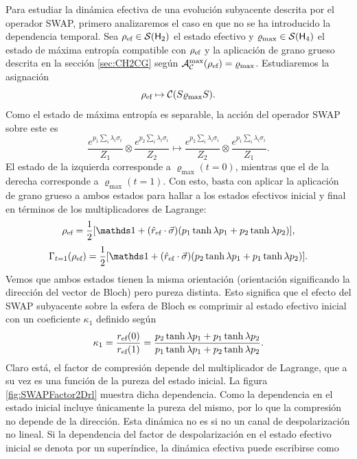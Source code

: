Para estudiar la dinámica efectiva de una evolución subyacente descrita por el operador SWAP, primero analizaremos el caso en que no se ha introducido la dependencia temporal. Sea $\rho_{\text{ef}}\in\mathcal{S}({\sf H}_{2})$ el estado efectivo y $\varrho_{\max}\in\mathcal{S}({\sf H}_{4})$ el estado de máxima entropía compatible con $\rho_{\text{ef}}$ y la aplicación de grano grueso descrita en la sección \ref{sec:CH2CG} según $\mathcal{A}_{\mathcal{C}}^{\max}(\rho_{\text{ef}})=\varrho_{\max}$. Estudiaremos la asignación
\begin{equation}
  \rho_{\text{ef}}\mapsto \mathcal{C}(S \varrho_{\max} S).
\end{equation}
Como el estado de máxima entropía es separable, la acción del operador SWAP sobre este es
\begin{equation}
  \frac{e^{p_{1}\sum_{i}\lambda_{i}\sigma_{i}}}{Z_{1}} \otimes \frac{e^{p_{2}\sum_{i}\lambda_{i}\sigma_{i}}}{Z_{2}}\mapsto\frac{e^{p_{2}\sum_{i}\lambda_{i}\sigma_{i}}}{Z_{2}}\otimes\frac{e^{p_{1}\sum_{i}\lambda_{i}\sigma_{i}}}{Z_{1}}.\nonumber
\end{equation}
El estado de la izquierda corresponde a $\varrho_{\max}(t=0)$, mientras que el de la derecha corresponde a $\varrho_{\max}(t=1)$. Con esto, basta con aplicar la aplicación de grano grueso a ambos estados para hallar a los estados efectivos inicial y final en términos de los multiplicadores de Lagrange:
\begin{equation}
\rho_{\ef}=\frac{1}{2}[\Id+(\hat{r}_{\ef}\cdot\vec{\sigma})(p_{1}\tanh{\lambda p_{1}}+p_{2}\tanh{\lambda p_{2}})],
\end{equation}
\begin{equation}
\Gamma_{t=1}(\rho_{\ef})=\frac{1}{2}[\Id+(\hat{r}_{\ef}\cdot\vec{\sigma})(p_{2}\tanh{\lambda p_{1}}+p_{1}\tanh{\lambda p_{2}})].
\end{equation}
Vemos que ambos estados tienen la misma orientación (orientación significando la dirección del vector de Bloch) pero pureza distinta. Esto significa que el efecto del \textsc{SWAP} subyacente sobre la esfera de Bloch es comprimir al estado efectivo inicial con un coeficiente $\kappa_{1}$ definido según
\begin{equation}\label{eq:SWAPFactor}
  \kappa_{1}=\frac{r_{\text{ef}}(0)}{r_{\text{ef}}(1)}=\frac{p_{2}\tanh{\lambda p_{1}}+p_{1}\tanh{\lambda p_{2}}}{
    p_{1}\tanh{\lambda p_{1}}+p_{2}\tanh{\lambda p_{2}}}.
\end{equation}
Claro está, el factor de compresión depende del multiplicador de Lagrange, que a su vez es una función de la pureza del estado inicial. La figura \ref{fig:SWAPFactor2Drl} muestra dicha dependencia. Como la dependencia en el estado inicial incluye únicamente la pureza del mismo, por lo que la compresión no depende de la dirección. Esta dinámica no es si no un canal de despolarización no lineal. Si la dependencia del factor de despolarización en el estado efectivo inicial se denota por un superíndice, la dinámica efectiva puede escribirse como
